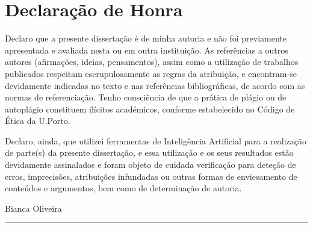 \chapter*{Declaração de Honra}

Declaro que a presente dissertação é de minha autoria e não foi previamente
apresentada e avaliada nesta ou em outra instituição.
As referências a outros autores (afirmações, ideias, pensamentos),
assim como a utilização de trabalhos publicados respeitam escrupulosamente
as regras da atribuição, e encontram-se devidamente indicadas no texto e
nas referências bibliográficas, de acordo com as normas de referenciação.
Tenho consciência de que a prática de plágio ou de autoplágio constituem
ilícitos académicos, conforme estabelecido no Código de Ética da U.Porto.

Declaro, ainda, que utilizei ferramentas de Inteligência Artificial para a
realização de parte(s) da presente dissertação, e essa utilização e os seus
resultados estão devidamente assinalados e foram objeto de cuidada
verificação para deteção de erros, imprecisões, atribuições infundadas
ou outras formas de enviesamento de conteúdos e argumentos, bem como
de determinação de autoria.

\begin{flushleft}
\baselineskip
Bianca Oliveira
\baselineskip
\rule{0.6\linewidth}{0.2mm}
\end{flushleft}
